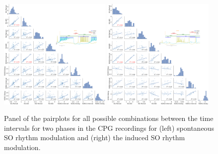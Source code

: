  
\begin{figure}[htbp]
	\centering
	\includegraphics[width=0.48\textwidth]{./img/invariants/data/SUSSEX/prep4_so_driven_2/images/panel_with_pairplot.png}
	\includegraphics[width=0.48\textwidth]{./img/invariants/data/SUSSEX/SO_driven/images/panel_with_pairplot.png}
	\caption{Panel of the pairplots for all possible combinations between the time intervals for two phases in the CPG recordings for (left) spontaneous SO rhythm modulation and (right) the induced SO rhythm modulation.}
	\label{fig:so pairplot comparison}
\end{figure}

\newpage
